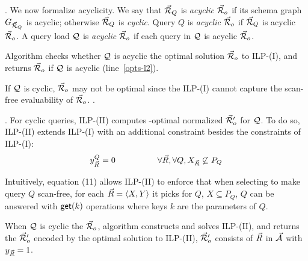 . We now formalize acyclicity.
We say that $\vec{{\mathcal R}}_{Q}$ is {\em acyclic \wrt $\vec{{\mathcal R}}_{o}$} if its schema
graph $G_{\vec{{\mathcal R}}_{Q}}$ is acyclic; otherwise $\vec{{\mathcal R}}_{Q}$ is
{\em cyclic}. Query $Q$ is {\em acyclic} \wrt $\vec{{\mathcal R}}_{o}$ if
$\vec{{\mathcal R}}_{Q}$ is acyclic \wrt $\vec{{\mathcal R}}_{o}$. A query load $\mathcal Q$ is
{\em acyclic} \wrt $\vec{{\mathcal R}}_{o}$ if each query in $\mathcal Q$ is acyclic \wrt
$\vec{{\mathcal R}}_{o}$.


\vspace{0.8ex}
Algorithm \opts checks whether $\mathcal Q$ is acyclic \wrt the optimal
solution $\vec{{\mathcal R}}_{o}$ to ILP-(I), and returns $\vec{{\mathcal R}}_{o}$ 
if $\mathcal Q$ is acyclic (line~\ref{opts-l2}). %

If $\mathcal Q$ is
cyclic, $\vec{{\mathcal R}}_{o}$ may not be optimal since the ILP-(I) cannot
capture the scan-free evaluability of $\vec{{\mathcal R}}_{o}$. . %


\vspace{0.36ex}

.
For cyclic queries,
ILP-(II) computes %
\ssf-optimal normalized \bds $\vec{{\mathcal R}}_{o}'$ for $\mathcal Q$. 
To do so, ILP-(II) %
extends ILP-(I) with an additional constraint besides the constraints
of ILP-(I):
\vspace{-0.7ex}
\begin{alignat}{2}                                                       
&  y_{\vec{R}}^{Q} = 0 &~~~~~~~~~~~~\forall \vec{R}, \forall Q, X_{\vec{R}}\not\subseteq P_{Q}
\end{alignat}                                                            

\vspace{-0.7ex}

Intuitively, equation (11) allows ILP-(II) to enforce that when
selecting \bss to make query $Q$ scan-free, for each
\bs $\vec{R} \allowbreak = \allowbreak \langle X,\allowbreak Y\rangle$ it picks for $Q$, $X\subseteq
P_{Q}$, \ie $Q$ can be answered with $\protect\mathsf{get}(k)$ operations where keys 
$k$ are  the parameters of $Q$.


\vspace{0.36ex}
When $\mathcal Q$ is cyclic \wrt the \bds $\vec{{\mathcal R}}_{o}$,
algorithm \opts constructs and solves
ILP-(II), and returns the \bds $\vec{{\mathcal R}}_{o}'$ encoded by the
optimal solution to ILP-(II), \ie $\vec{{\mathcal R}}_{o}'$ consists of \bss
$\vec{R}$ in $\vec{{\mathcal A}}$ with $y_{\vec{R}} = 1$. 


